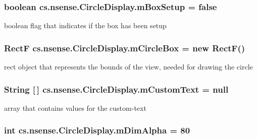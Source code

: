 \hypertarget{classcs_1_1nsense_1_1_circle_display_a6c37ecdf3473018a470fa6f06d11d14a}{
\subsubsection[{m\-Box\-Setup}]{\setlength{\rightskip}{0pt plus 5cm}boolean cs.\-nsense.\-Circle\-Display.\-m\-Box\-Setup = false\hspace{0.3cm}{\ttfamily [private]}}}\label{classcs_1_1nsense_1_1_circle_display_a6c37ecdf3473018a470fa6f06d11d14a}
boolean flag that indicates if the box has been setup \hypertarget{classcs_1_1nsense_1_1_circle_display_a567ff653ac64f18c2b932af4435751d1}{
\subsubsection[{m\-Circle\-Box}]{\setlength{\rightskip}{0pt plus 5cm}Rect\-F cs.\-nsense.\-Circle\-Display.\-m\-Circle\-Box = new Rect\-F()\hspace{0.3cm}{\ttfamily [private]}}}\label{classcs_1_1nsense_1_1_circle_display_a567ff653ac64f18c2b932af4435751d1}
rect object that represents the bounds of the view, needed for drawing the circle \hypertarget{classcs_1_1nsense_1_1_circle_display_a604278e27ef7d368ba3a941ac49f44e8}{
\subsubsection[{m\-Custom\-Text}]{\setlength{\rightskip}{0pt plus 5cm}String \mbox{[}$\,$\mbox{]} cs.\-nsense.\-Circle\-Display.\-m\-Custom\-Text = null\hspace{0.3cm}{\ttfamily [private]}}}\label{classcs_1_1nsense_1_1_circle_display_a604278e27ef7d368ba3a941ac49f44e8}
array that contains values for the custom-\/text \hypertarget{classcs_1_1nsense_1_1_circle_display_ad99963b0e3b50d420b6137c003976399}{
\subsubsection[{m\-Dim\-Alpha}]{\setlength{\rightskip}{0pt plus 5cm}int cs.\-nsense.\-Circle\-Display.\-m\-Dim\-Alpha = 80\hspace{0.3cm}{\ttfamily [private]}}}\label{classcs_1_1nsense_1_1_circle_display_ad99963b0e3b50d420b6137c003976399}
